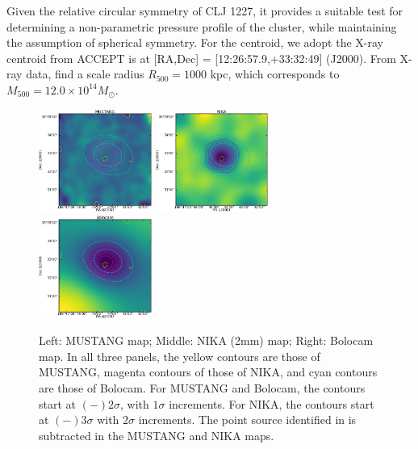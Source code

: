 \documentclass[twocolumn,traditabstract]{aa}
\begin{document}
Given the relative circular symmetry of CLJ 1227, it provides a suitable test for determining a non-parametric pressure
profile of the cluster, while maintaining the assumption of spherical symmetry. For the centroid, we adopt the X-ray
centroid from ACCEPT \citep{cavagnolo2009} is at [RA,Dec] = [12:26:57.9,+33:32:49] (J2000).
From X-ray data, \citet{mantz2010} find a scale radius $R_{500} = 1000$ kpc, which corresponds to
$M_{500} = 12.0 \times 10^{14} M_{\odot}$.

\begin{figure}[!h]
  \centering
  \includegraphics[width=0.33\textwidth]{NIKA_ml_deproj_figs/MUSTANG_image_and_SNR_contours_v2.eps}
  \includegraphics[width=0.33\textwidth]{NIKA_ml_deproj_figs/NIKA_image_and_SNR_contours_v2.eps}
  \includegraphics[width=0.33\textwidth]{NIKA_ml_deproj_figs/BOLOCAM_image_and_SNR_contours_v2.eps}
  \caption{Left: MUSTANG map; Middle: NIKA (2mm) map; Right: Bolocam map. In all three panels, the yellow contours are those
    of MUSTANG, magenta contours of those of NIKA, and cyan contours are those of Bolocam. For MUSTANG and Bolocam, the contours
    start at $(-)2\sigma$, with $1\sigma$ increments. For NIKA, the contours start at $(-)3\sigma$ with $2\sigma$ increments.
    The point source identified in \citet{adam2015} is subtracted in the MUSTANG
    and NIKA maps.}
  \label{fig:clj1227_maps}
\end{figure}
\end{document}
